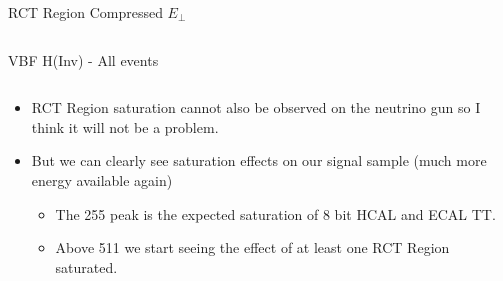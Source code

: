 \documentclass[8pt]{beamer}
\begin{document}
\begin{frame}{RCT Region Compressed $E_{\perp}$}
\begin{columns}
\begin{block}{VBF H(Inv) - All events}
\end{block}

\end{columns}

\begin{tiny}

\begin{itemize}
  \item RCT Region saturation cannot also be observed on the neutrino gun so I think it will not be a problem.
  \item But we can clearly see saturation effects on our signal sample (much more energy available again) 
  \begin{itemize}
    \tiny
    \item The 255 peak is the expected saturation of 8 bit HCAL and ECAL TT.
    \item Above 511 we start seeing the effect of at least one RCT Region saturated. 
  \end{itemize}
\end{itemize}

\end{tiny}

\end{frame}
\end{document}
